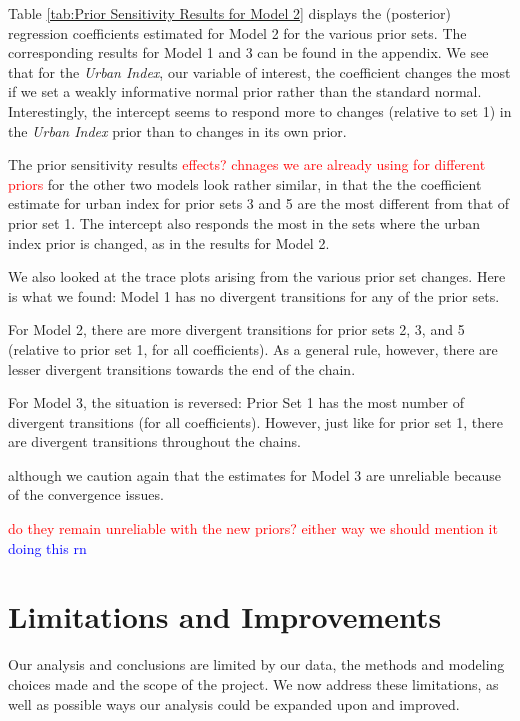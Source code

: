 \documentclass[12pt]{article}
\newcommand{\red}[1]{\textcolor{red}{#1}}
\newcommand{\blue}[1]{\textcolor{blue}{#1}}
\begin{document}
Table \ref{tab:Prior Sensitivity Results for Model 2} displays the (posterior) regression coefficients estimated for Model 2 for the various prior sets. The corresponding results for Model 1 and 3 can be found in the appendix. We see that for the \textit{Urban Index}, our variable of interest, the coefficient changes the most if we set a weakly informative normal prior rather than the standard normal. Interestingly, the intercept seems to respond more to changes (relative to set 1) in the \textit{Urban Index} prior than to changes in its own prior.

The prior sensitivity results \red{effects? chnages we are already using for different priors} for the other two models look rather similar, in that the the coefficient estimate for urban index for prior sets 3 and 5 are the most different from that of prior set 1. The intercept also responds the most in the sets where the urban index prior is changed, as in the results for Model 2.

We also looked at the trace plots arising from the various prior set changes. Here is what we found: Model 1 has no divergent transitions for any of the prior sets.

For Model 2, there are more divergent transitions for prior sets 2, 3, and 5  (relative to prior set 1, for all coefficients). As a general rule, however, there are lesser divergent transitions towards the end of the chain. 

For Model 3, the situation is reversed: Prior Set 1 has the most number of divergent transitions (for all coefficients). However, just like for prior set 1, there are divergent transitions throughout the chains.

although we caution again that the estimates for Model 3 are unreliable because of the convergence issues.

\red{do they remain unreliable with the new priors? either way we should mention it} \blue{doing this rn}






\section{Limitations and Improvements}

Our analysis and conclusions are limited by our data, the methods and modeling choices made and the scope of the project.
We now address these limitations, as well as possible ways our analysis could be expanded upon and improved.
\end{document}
